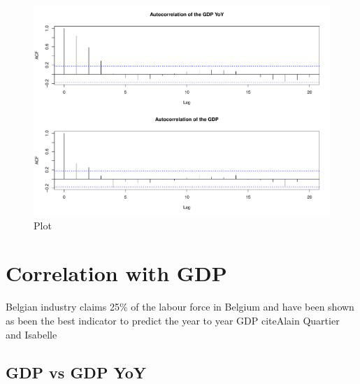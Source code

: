 \documentclass[12pt,a4paper,oneside]{book}
\begin{document}
\begin{figure}[H]
    \centering
    \captionsetup{justification=centering}
    \includegraphics[scale=0.45]{Graphs/ACF_GDP.pdf}
    \caption{Plot }
    \label{A_corplot}
\end{figure}



\section{Correlation with GDP}

Belgian industry claims 25\% of the labour force in Belgium and have been shown as been the best indicator to predict the year to year GDP
cite{Alain Quartier and Isabelle}


\subsection*{GDP vs GDP YoY}
\end{document}
